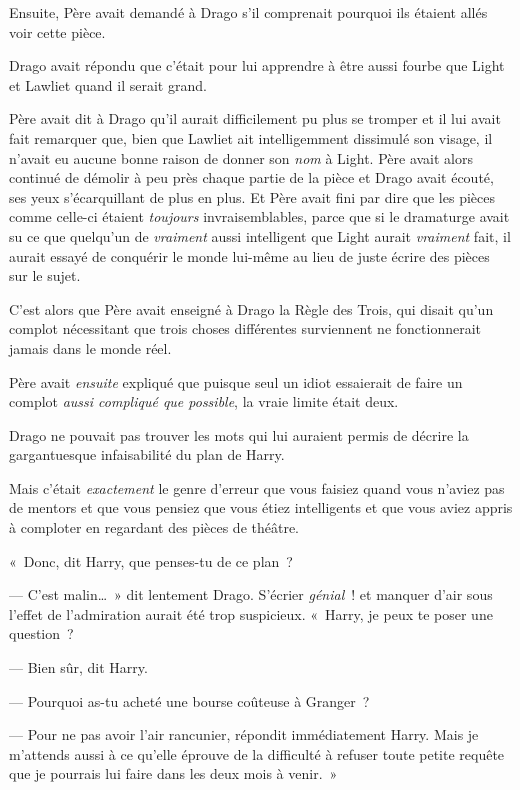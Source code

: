 Ensuite, Père avait demandé à Drago s'il comprenait pourquoi ils étaient allés voir cette pièce.

Drago avait répondu que c'était pour lui apprendre à être aussi fourbe que Light et Lawliet quand il serait grand.

Père avait dit à Drago qu'il aurait difficilement pu plus se tromper et il lui avait fait remarquer que, bien que Lawliet ait intelligemment dissimulé son visage, il n'avait eu aucune bonne raison de donner son \emph{nom} à Light.
Père avait alors continué de démolir à peu près chaque partie de la pièce et Drago avait écouté, ses yeux s'écarquillant de plus en plus.
Et Père avait fini par dire que les pièces comme celle-ci étaient \emph{toujours} invraisemblables, parce que si le dramaturge avait su ce que quelqu'un de \emph{vraiment} aussi intelligent que Light aurait \emph{vraiment} fait, il aurait essayé de conquérir le monde lui-même au lieu de juste écrire des pièces sur le sujet.

C'est alors que Père avait enseigné à Drago la Règle des Trois, qui disait qu'un complot nécessitant que trois choses différentes surviennent ne fonctionnerait jamais dans le monde réel.

Père avait \emph{ensuite} expliqué que puisque seul un idiot essaierait de faire un complot \emph{aussi compliqué que possible}, la vraie limite était deux.

Drago ne pouvait pas trouver les mots qui lui auraient permis de décrire la gargantuesque infaisabilité du plan de Harry.

Mais c'était \emph{exactement} le genre d'erreur que vous faisiez quand vous n'aviez pas de mentors et que vous pensiez que vous étiez intelligents et que vous aviez appris à comploter en regardant des pièces de théâtre.

«~Donc, dit Harry, que penses-tu de ce plan~?

--- C'est malin…~»
dit lentement Drago.
S'écrier \emph{génial}~! et manquer d'air sous l'effet de l'admiration aurait été trop suspicieux.
«~Harry, je peux te poser une question~?

--- Bien sûr, dit Harry.

--- Pourquoi as-tu acheté une bourse coûteuse à Granger~?

--- Pour ne pas avoir l'air rancunier, répondit immédiatement Harry.
Mais je m'attends aussi à ce qu'elle éprouve de la difficulté à refuser toute petite requête que je pourrais lui faire dans les deux mois à venir.~»

